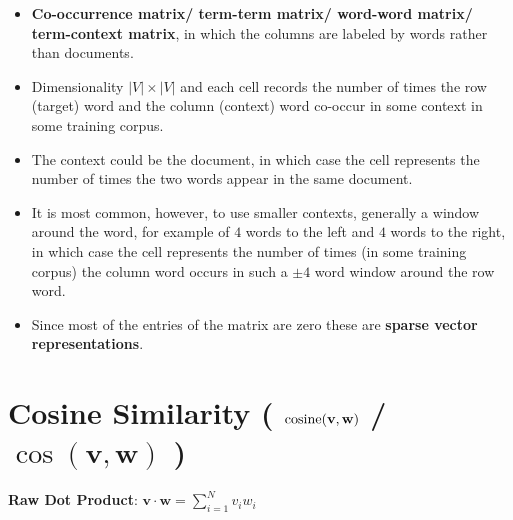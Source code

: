 \begin{itemize}
    \item \textbf{Co-occurrence matrix/ term-term matrix/ word-word matrix/ term-context matrix}\label{Co-occurrence matrix/ term-term matrix/ word-word matrix/ term-context matrix}, in which the columns are labeled by words rather than documents. 
    
    \item Dimensionality $|V|\times|V|$ and each cell records the number of times the row (target) word and the column (context) word co-occur in some context in some training corpus.

    \item The context could be the document, in which case the cell represents the number of times the two words appear in the same document.

    \item It is most common, however, to use smaller contexts, generally a window around the word, for example of $4$ words to the left and $4$ words to the right, in which case the cell represents the number of times (in some training corpus) the column word occurs in such a $\pm 4$ word window around the row word.

    \item Since most of the entries of the matrix are zero these are \textbf{sparse vector representations}.
\end{itemize}



\section{Cosine Similarity ( $\operatorname{cosine}(\mathbf{v,w})$ / $\cos(\mathbf{v,w})$ ) \cite{nlp-1}}\label{Cosine Similarity}

\textbf{Raw Dot Product}: \( \displaystyle\mathbf{v \cdot w} = \sum_{i=1}^{N} v_i w_i \)

